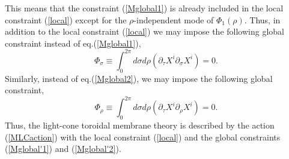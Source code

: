 \documentclass[12pt,a4paper]{article}
\newcommand{\ptau}{\partial_\tau}
\newcommand{\psig}{\partial_\sigma}
\newcommand{\prho}{\partial_\rho}
\begin{document}
This means that the constraint (\ref{Mglobal1}) is already included in
the local constraint (\ref{local}) except for the $\rho$-independent
mode of $\Phi_1(\rho)$. Thus, in addition to the local constraint
(\ref{local}) we may impose the following global constraint instead
of eq.(\ref{Mglobal1}),
\begin{equation}
 \Phi_\sigma\equiv\int_0^{2\pi} d\sigma d\rho
	(\ptau X^i\psig X^i)=0.\label{Mglobal'1}
\end{equation}
Similarly, instead of eq.(\ref{Mglobal2}), we may impose the following
global constraint,
\begin{equation}
  \Phi_\rho\equiv\int_0^{2\pi} d\sigma d
	\rho(\ptau X^i\prho X^i)=0.\label{Mglobal'2}
\end{equation}
Thus, the light-cone toroidal membrane theory is described by the
action (\ref{MLCaction}) with the local constraint (\ref{local})
and the global constraints (\ref{Mglobal'1}) and (\ref{Mglobal'2}).
\end{document}
